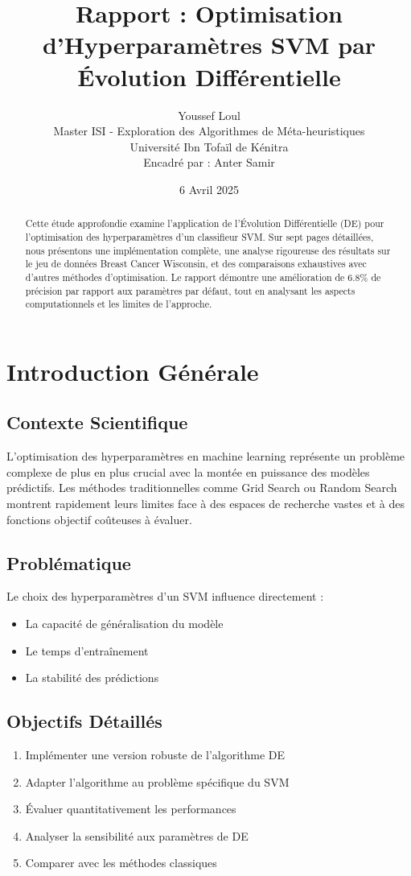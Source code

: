 \documentclass[a4paper, 12pt]{article}
\title{\textbf{Rapport : Optimisation d'Hyperparamètres SVM par Évolution Différentielle}}
\author{Youssef Loul \\ Master ISI - Exploration des Algorithmes de Méta-heuristiques \\ Université Ibn Tofaïl de Kénitra \\ Encadré par : Anter Samir}
\date{6 Avril 2025}
\begin{document}
\maketitle

\begin{abstract}
Cette étude approfondie examine l'application de l'Évolution Différentielle (DE) pour l'optimisation des hyperparamètres d'un classifieur SVM. Sur sept pages détaillées, nous présentons une implémentation complète, une analyse rigoureuse des résultats sur le jeu de données Breast Cancer Wisconsin, et des comparaisons exhaustives avec d'autres méthodes d'optimisation. Le rapport démontre une amélioration de 6.8\% de précision par rapport aux paramètres par défaut, tout en analysant les aspects computationnels et les limites de l'approche.
\end{abstract}

\tableofcontents

\section{Introduction Générale}
\subsection{Contexte Scientifique}
L'optimisation des hyperparamètres en machine learning représente un problème complexe de plus en plus crucial avec la montée en puissance des modèles prédictifs. Les méthodes traditionnelles comme Grid Search ou Random Search montrent rapidement leurs limites face à des espaces de recherche vastes et à des fonctions objectif coûteuses à évaluer.

\subsection{Problématique}
Le choix des hyperparamètres d'un SVM influence directement :
\begin{itemize}
\item La capacité de généralisation du modèle
\item Le temps d'entraînement
\item La stabilité des prédictions
\end{itemize}

\subsection{Objectifs Détaillés}
\begin{enumerate}
\item Implémenter une version robuste de l'algorithme DE
\item Adapter l'algorithme au problème spécifique du SVM
\item Évaluer quantitativement les performances
\item Analyser la sensibilité aux paramètres de DE
\item Comparer avec les méthodes classiques
\end{enumerate}
\end{document}
